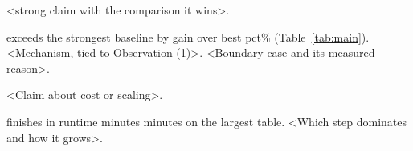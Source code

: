 \begin{finding}
\label{find:main}
\sys{} <strong claim with the comparison it wins>.
\end{finding}
\sys{} exceeds the strongest baseline by \num{gain over best pct}\% (Table~\ref{tab:main}). <Mechanism, tied to Observation (1)>. <Boundary case and its measured reason>.

\begin{finding}
\label{find:cost}
<Claim about cost or scaling>.
\end{finding}
\sys{} finishes in \num{runtime minutes} minutes on the largest table. <Which step dominates and how it grows>.
